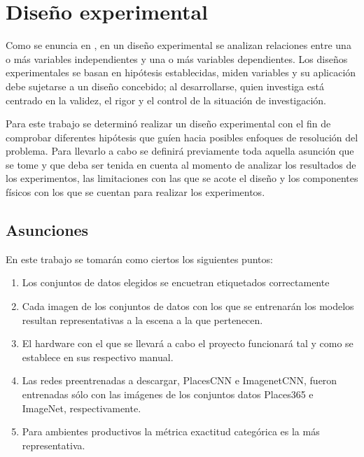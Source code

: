 \section{Diseño experimental}

Como se enuncia en \cite{hernandez2010metodologia}, en un diseño experimental se analizan relaciones entre una o más variables independientes y una o más variables dependientes. Los diseños experimentales se basan en hipótesis establecidas, miden variables y su aplicación debe sujetarse a un diseño concebido; al desarrollarse, quien investiga está centrado en la validez, el rigor y el control de la situación de investigación.

Para este trabajo se determinó realizar un diseño experimental con el fin de comprobar diferentes hipótesis que guíen hacia posibles enfoques de resolución del problema. Para llevarlo a cabo se definirá previamente toda aquella asunción que se tome y que deba ser tenida en cuenta al momento de analizar los resultados de los experimentos, las limitaciones con las que se acote el diseño y los componentes físicos con los que se cuentan para realizar los experimentos.

\subsection{Asunciones}
En este trabajo se tomarán como ciertos los siguientes puntos:
\begin{enumerate}
	\item Los conjuntos de datos elegidos se encuetran etiquetados correctamente 
	\item Cada imagen de los conjuntos de datos con los que se entrenarán los modelos resultan representativas a la escena a la que pertenecen.
	\item El hardware con el que se llevará a cabo el proyecto funcionará tal y como se establece en sus respectivo manual.
	\item Las redes preentrenadas a descargar, PlacesCNN e ImagenetCNN, fueron entrenadas sólo con las imágenes de los conjuntos datos Places365 e ImageNet, respectivamente.
	\item Para ambientes productivos la métrica exactitud categórica \cite{scikit-learn} es la más representativa.
\end{enumerate}

